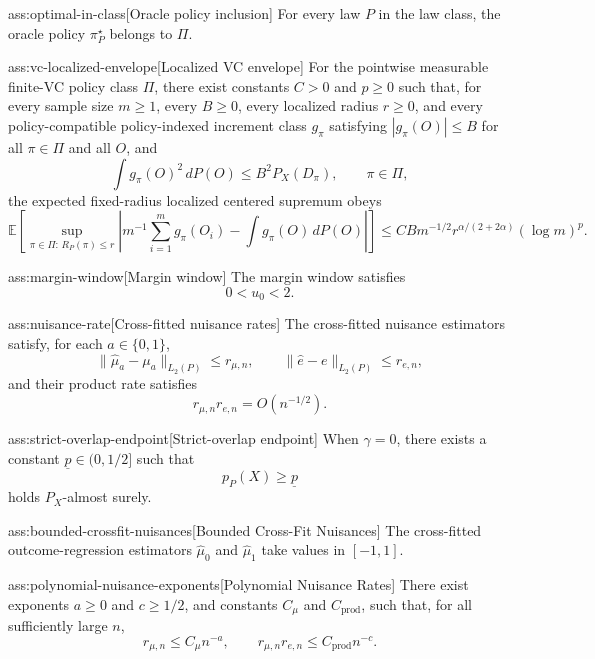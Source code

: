 \begin{assumptionv}{ass:optimal-in-class}[Oracle policy inclusion]
For every law \(P\) in the law class, the oracle policy \(\pi^\star_P\) belongs to \(\Pi\).
\end{assumptionv}

\begin{assumptionv}{ass:vc-localized-envelope}[Localized VC envelope]
For the pointwise measurable finite-VC policy class \(\Pi\), there exist constants \(C>0\) and \(p\ge0\) such that, for every sample size \(m\ge1\), every \(B\ge0\), every localized radius \(r\ge0\), and every policy-compatible policy-indexed increment class \(g_\pi\) satisfying \(|g_\pi(O)|\le B\) for all \(\pi\in\Pi\) and all \(O\), and
\[
\int g_\pi(O)^2\,dP(O) \le B^2 P_X(D_\pi),\qquad \pi\in\Pi,
\]
the expected fixed-radius localized centered supremum obeys
\[
\mathbb E\left[\sup_{\pi\in\Pi:\,R_P(\pi)\le r}\left|m^{-1}\sum_{i=1}^m g_\pi(O_i)-\int g_\pi(O)\,dP(O)\right|\right]
\le C B m^{-1/2} r^{\alpha/(2+2\alpha)}(\log m)^p .
\]
\end{assumptionv}

\begin{assumptionv}{ass:margin-window}[Margin window]
The margin window satisfies
\[
0<u_0<2.
\]
\end{assumptionv}

\begin{assumptionv}{ass:nuisance-rate}[Cross-fitted nuisance rates]
The cross-fitted nuisance estimators satisfy, for each \(a\in\{0,1\}\),
\[
\|\widehat\mu_a-\mu_a\|_{L_2(P)}\le r_{\mu,n},
\qquad
\|\widehat e-e\|_{L_2(P)}\le r_{e,n},
\]
and their product rate satisfies
\[
r_{\mu,n}r_{e,n}=O(n^{-1/2}).
\]
\end{assumptionv}

\begin{assumptionv}{ass:strict-overlap-endpoint}[Strict-overlap endpoint]
When \(\gamma=0\), there exists a constant \(\underline p\in(0,1/2]\) such that
\[
p_P(X)\ge \underline p
\]
holds \(P_X\)-almost surely.
\end{assumptionv}

\begin{assumptionv}{ass:bounded-crossfit-nuisances}[Bounded Cross-Fit Nuisances]
The cross-fitted outcome-regression estimators \(\widehat\mu_0\) and \(\widehat\mu_1\) take values in \([-1,1]\).
\end{assumptionv}

\begin{assumptionv}{ass:polynomial-nuisance-exponents}[Polynomial Nuisance Rates]
There exist exponents \(a\ge 0\) and \(c\ge 1/2\), and constants \(C_\mu\) and \(C_{\mathrm{prod}}\), such that, for all sufficiently large \(n\),
\[
r_{\mu,n}\le C_\mu n^{-a},
\qquad
r_{\mu,n}r_{e,n}\le C_{\mathrm{prod}}n^{-c}.
\]
\end{assumptionv}

